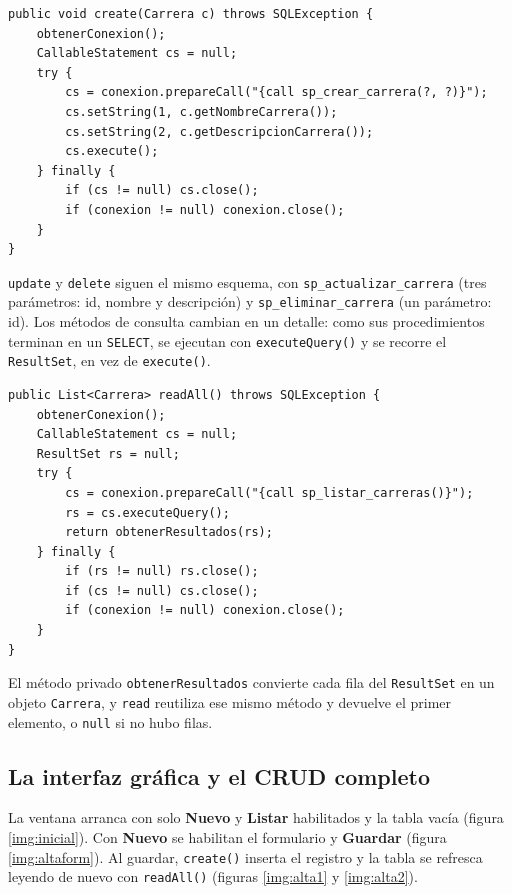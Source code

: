 \documentclass[10pt,a4paper]{article}
\begin{document}
\begin{lstlisting}[caption={Alta de una carrera: \texttt{create} llama a \texttt{sp\_crear\_carrera}}]
public void create(Carrera c) throws SQLException {
    obtenerConexion();
    CallableStatement cs = null;
    try {
        cs = conexion.prepareCall("{call sp_crear_carrera(?, ?)}");
        cs.setString(1, c.getNombreCarrera());
        cs.setString(2, c.getDescripcionCarrera());
        cs.execute();
    } finally {
        if (cs != null) cs.close();
        if (conexion != null) conexion.close();
    }
}
\end{lstlisting}

\texttt{update} y \texttt{delete} siguen el mismo esquema, con \texttt{sp\_actualizar\_carrera} (tres parámetros: id, nombre y descripción) y \texttt{sp\_eliminar\_carrera} (un parámetro: id). Los métodos de consulta cambian en un detalle: como sus procedimientos terminan en un \texttt{SELECT}, se ejecutan con \texttt{executeQuery()} y se recorre el \texttt{ResultSet}, en vez de \texttt{execute()}.

\begin{lstlisting}[caption={Consulta general: \texttt{readAll} llama a \texttt{sp\_listar\_carreras}}]
public List<Carrera> readAll() throws SQLException {
    obtenerConexion();
    CallableStatement cs = null;
    ResultSet rs = null;
    try {
        cs = conexion.prepareCall("{call sp_listar_carreras()}");
        rs = cs.executeQuery();
        return obtenerResultados(rs);
    } finally {
        if (rs != null) rs.close();
        if (cs != null) cs.close();
        if (conexion != null) conexion.close();
    }
}
\end{lstlisting}

El método privado \texttt{obtenerResultados} convierte cada fila del \texttt{ResultSet} en un objeto \texttt{Carrera}, y \texttt{read} reutiliza ese mismo método y devuelve el primer elemento, o \texttt{null} si no hubo filas.

\subsection{La interfaz gráfica y el CRUD completo}

La ventana arranca con solo \textbf{Nuevo} y \textbf{Listar} habilitados y la tabla vacía (figura \ref{img:inicial}). Con \textbf{Nuevo} se habilitan el formulario y \textbf{Guardar} (figura \ref{img:altaform}). Al guardar, \texttt{create()} inserta el registro y la tabla se refresca leyendo de nuevo con \texttt{readAll()} (figuras \ref{img:alta1} y \ref{img:alta2}).
\end{document}
